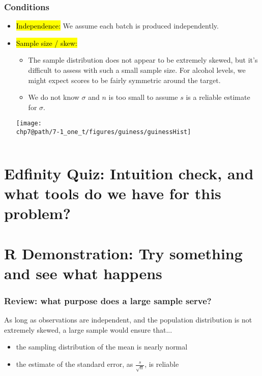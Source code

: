 \documentclass[slidestop,compress,mathserif]{beamer}
\makeatletter
\def\chp7@path{../../Chp 7}
\makeatother
\begin{document}
\begin{frame}
\frametitle{Conditions}

\begin{itemize}
\item \hl{Independence:} We assume each batch is produced independently.
\pause
\item \hl{Sample size / skew:} $\:$ \\
\pause{}
{
{\tiny
\begin{itemize}
\item The sample distribution does not appear to be extremely skewed, but it's difficult to assess with such a small sample size. For alcohol levels, we might expect scores to be fairly symmetric around the target.
\item We do not know $\sigma$ and $n$ is too small to assume $s$ is a reliable estimate for $\sigma$.
\end{itemize}
}
}
{
\texttt{[image: \\chp7@path/7-1\_one\_t/figures/guiness/guinessHist]}
}
\end{itemize}
$\:$ \\
\pause
{}
\end{frame}


\section{Edfinity Quiz: Intuition check, and what tools do we have for this problem?}


\section{R Demonstration: Try something and see what happens}


\begin{frame}
\frametitle{Review: what purpose does a large sample serve?}

As long as observations are independent, and the population distribution is not extremely skewed, a large sample would ensure that...

\begin{itemize}

\item the sampling distribution of the mean is nearly normal

\item the estimate of the standard error, as $\frac{s}{\sqrt{n}}$, is reliable

\end{itemize}

\end{frame}
\end{document}
